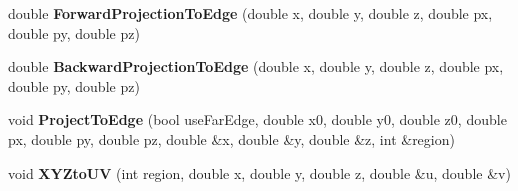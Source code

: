 \begin{DoxyCompactItemize}
\item 
\hypertarget{classANNIEGeometry_a88ff7bd1fcd9ed044c177ebbc875e4af}{double {\bfseries Forward\-Projection\-To\-Edge} (double x, double y, double z, double px, double py, double pz)}\label{classANNIEGeometry_a88ff7bd1fcd9ed044c177ebbc875e4af}

\item 
\hypertarget{classANNIEGeometry_adcc43a523767429765600b7c103dd5e9}{double {\bfseries Backward\-Projection\-To\-Edge} (double x, double y, double z, double px, double py, double pz)}\label{classANNIEGeometry_adcc43a523767429765600b7c103dd5e9}

\item 
\hypertarget{classANNIEGeometry_a8b4c2a1c960041a8c36c29c40bde9cb1}{void {\bfseries Project\-To\-Edge} (bool use\-Far\-Edge, double x0, double y0, double z0, double px, double py, double pz, double \&x, double \&y, double \&z, int \&region)}\label{classANNIEGeometry_a8b4c2a1c960041a8c36c29c40bde9cb1}

\item 
\hypertarget{classANNIEGeometry_a8b839b45c5eace4880b79d451b6e6f29}{void {\bfseries X\-Y\-Zto\-U\-V} (int region, double x, double y, double z, double \&u, double \&v)}\label{classANNIEGeometry_a8b839b45c5eace4880b79d451b6e6f29}

\end{DoxyCompactItemize}
